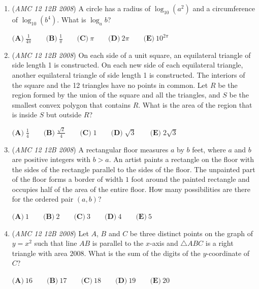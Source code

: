 \begin{enumerate}
 $\textbf{(A)}\ \frac{12-5\sqrt{3}}{72} \qquad \textbf{(B)}\ \frac{12-5\sqrt{3}}{36} \qquad \textbf{(C)}\ \frac{\sqrt{3}}{18} \qquad \textbf{(D)}\ \frac{3-\sqrt{3}}{9} \qquad \textbf{(E)}\ \frac{\sqrt{3}}{12}$


	\item (\textit{AMC 12 12B 2008}) A circle has a radius of $\log_{10}{(a^2)}$ and a circumference of $\log_{10}{(b^4)}$. What is $\log_{a}{b}$?


 $\textbf{(A)}\ \frac{1}{4\pi} \qquad \textbf{(B)}\ \frac{1}{\pi} \qquad \textbf{(C)}\ \pi \qquad \textbf{(D)}\ 2\pi \qquad \textbf{(E)}\ 10^{2\pi}$


	\item (\textit{AMC 12 12B 2008}) On each side of a unit square, an equilateral triangle of side length 1 is constructed. On each new side of each equilateral triangle, another equilateral triangle of side length 1 is constructed. The interiors of the square and the 12 triangles have no points in common. Let $R$ be the region formed by the union of the square and all the triangles, and $S$ be the smallest convex polygon that contains $R$. What is the area of the region that is inside $S$ but outside $R$?


 $\textbf{(A)} \; \frac {1}{4} \qquad \textbf{(B)} \; \frac {\sqrt {2}}{4} \qquad \textbf{(C)} \; 1 \qquad \textbf{(D)} \; \sqrt {3} \qquad \textbf{(E)} \; 2 \sqrt {3}$


	\item (\textit{AMC 12 12B 2008}) A rectangular floor measures $a$ by $b$ feet, where $a$ and $b$ are positive integers with $b > a$. An artist paints a rectangle on the floor with the sides of the rectangle parallel to the sides of the floor. The unpainted part of the floor forms a border of width $1$ foot around the painted rectangle and occupies half of the area of the entire floor. How many possibilities are there for the ordered pair $(a,b)$?


 $\textbf{(A)}\ 1\qquad\textbf{(B)}\ 2\qquad\textbf{(C)}\ 3\qquad\textbf{(D)}\ 4\qquad\textbf{(E)}\ 5$


	\item (\textit{AMC 12 12B 2008}) Let $A$, $B$ and $C$ be three distinct points on the graph of $y=x^2$ such that line $AB$ is parallel to the $x$-axis and $\triangle ABC$ is a right triangle with area $2008$. What is the sum of the digits of the $y$-coordinate of $C$?


 $\textbf{(A)}\ 16\qquad\textbf{(B)}\ 17\qquad\textbf{(C)}\ 18\qquad\textbf{(D)}\ 19\qquad\textbf{(E)}\ 20$



\end{enumerate}
